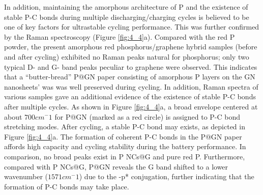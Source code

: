 In addition, maintaining the amorphous architecture of P and the existence of stable P-C bonds during multiple discharging/charging cycles is believed to be one of key factors for ultrastable cycling performance. This was further confirmed by the Raman spectroscopy (Figure \ref{fig:4_4}a). Compared with the red P powder, the present amorphous red phosphorus/graphene hybrid samples (before and after cycling) exhibited no Raman peaks natural for phosphorus; only two typical D- and G- band peaks peculiar to graphene were observed.\cite{Kim2013c} This indicates that a “butter-bread” P@GN paper consisting of amorphous P layers on the GN nanosheets’ was was well preserved during cycling. In addition, Raman spectra of various samples gave an additional evidence of the existence of stable P-C bonds after multiple cycles. As shown in Figure \ref{fig:4_4}a, a broad envelope centered at about $700 cm^-1$ for P@GN (marked as a red circle) is assigned to P-C bond stretching modes. After cycling, a stable P-C bond may exists, as depicted in Figure \ref{fig:4_4}a. The formation of coherent P-C bonds in the P@GN paper affords high capacity and cycling stability during the battery performance. In comparison, no broad peaks exist in P NCs@G and pure red P. Furthermore, compared with P NCs@G, P@GN reveals the G band shifted to a lower wavenumber ($1571 cm^-1$) due to the \pi-p* conjugation, further indicating that the formation of P-C bonds may take place. \\
